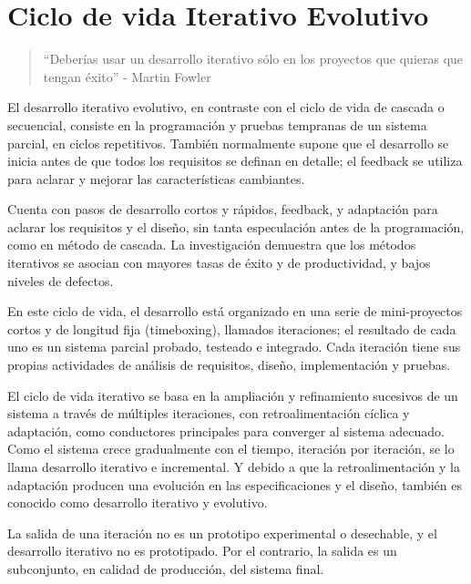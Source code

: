 \section{Ciclo de vida Iterativo Evolutivo}

\begin{quote}
“Deberías usar un desarrollo iterativo sólo en los proyectos que quieras que tengan éxito” - Martin Fowler
\end{quote}

El desarrollo iterativo evolutivo, en contraste con el ciclo de vida de cascada o secuencial, consiste en la programación y pruebas tempranas de un sistema parcial, en ciclos repetitivos. También normalmente supone que el desarrollo se inicia antes de que todos los requisitos se definan en detalle; el feedback se utiliza para aclarar y mejorar las características cambiantes.

Cuenta con pasos de desarrollo cortos y rápidos, feedback, y adaptación para aclarar los requisitos y el diseño, sin tanta especulación antes de la programación, como en método de cascada. La investigación demuestra que los métodos iterativos se asocian con mayores tasas de éxito y de productividad, y bajos niveles de defectos.

En este ciclo de vida, el desarrollo está organizado en una serie de mini-proyectos cortos y de longitud fija (timeboxing), llamados iteraciones; el resultado de cada uno es un sistema parcial probado, testeado e integrado. Cada iteración tiene sus propias actividades de análisis de requisitos, diseño, implementación y pruebas.

El ciclo de vida iterativo se basa en la ampliación y refinamiento sucesivos de un sistema a través de múltiples iteraciones, con retroalimentación cíclica y adaptación, como conductores principales para converger al sistema  adecuado. Como el sistema crece gradualmente con el tiempo, iteración por iteración, se lo llama desarrollo iterativo e incremental. Y debido a que la retroalimentación y la adaptación producen una evolución en las especificaciones y el diseño, también es conocido como desarrollo iterativo y evolutivo.

La salida de una iteración no es un prototipo experimental o desechable, y el desarrollo iterativo no es prototipado. Por el contrario, la salida es un subconjunto, en calidad de producción, del sistema final.

